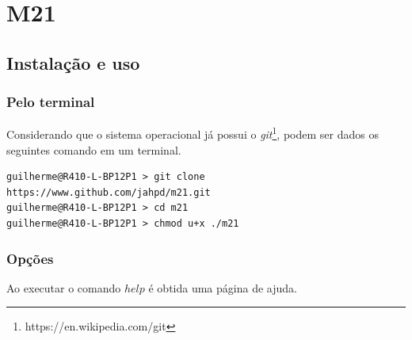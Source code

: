 \section{M21}\label{sec:m21}

\subsection{Instalação e uso}

\subsubsection*{Pelo terminal}
Considerando que o sistema operacional já possui o \emph{git}\footnote{https://en.wikipedia.com/git}, podem ser dados os seguintes comando em um terminal.

\begin{verbatim}
guilherme@R410-L-BP12P1 > git clone https://www.github.com/jahpd/m21.git
guilherme@R410-L-BP12P1 > cd m21
guilherme@R410-L-BP12P1 > chmod u+x ./m21
\end{verbatim}

\subsubsection*{Opções}

Ao executar o comando $help$ é obtida uma página de ajuda.

